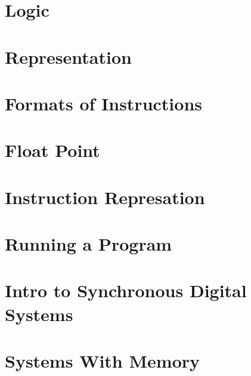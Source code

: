 \documentclass[en,11pt,english,black,simple,device=ppt]{elegantbook}
\begin{document}


\section{Logic}



\section{Representation}



\section{Formats of Instructions}



\section{Float Point}







\section{Instruction Represation}



\section{Running a Program}






\section{Intro to Synchronous Digital Systems}



\section{Systems With Memory}


\end{document}
